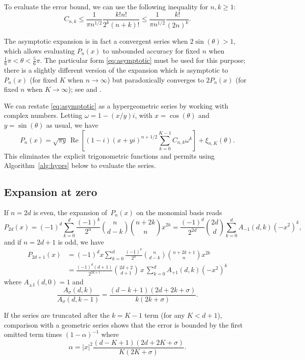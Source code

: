 \documentclass{siamart0216}
\begin{document}
To evaluate the error bound, we can use the following inequality for $n, k \ge 1$:
\begin{equation}
\label{eq:truncerr0b}
C_{n,k} \le \frac{1}{\pi n^{1/2}} \frac{k! n!}{2^k (n+k)!} \le \frac{1}{\pi n^{1/2}} \frac{k!}{(2n)^k}.
\end{equation}

The asymptotic expansion is in fact a convergent series
when $2 \sin(\theta) > 1$, which allows evaluating $P_n(x)$ to unbounded
accuracy for fixed $n$ when $\tfrac{1}{6}\pi < \theta < \tfrac{5}{6} \pi$.
The particular form \eqref{eq:asymptotic}
must be used for this purpose; there is a slightly different version of the expansion
which is asymptotic to $P_n(x)$ (for fixed $K$ when $n \to \infty$)
but paradoxically
converges to $2 P_n(x)$ (for fixed $n$ when $K \to \infty$); see \cite{Olver1997} and \cite{Olver2010}.

We can restate \eqref{eq:asymptotic} as a hypergeometric series
by working with complex numbers.
Letting $\omega = 1 - (x/y) i$, with $x = \cos(\theta)$ and $y =
\sin(\theta)$ as usual, we have
\begin{equation}
\label{eq:asymptoticcomplex}
P_n(x) = \sqrt{\pi y} \, \operatorname{Re}\left[
(1-i) (x+y i)^{n+1/2}
\sum_{k=0}^{K-1} C_{n,k} \omega^k\right] + \xi_{n,K}(\theta).
\end{equation}
This eliminates the explicit trigonometric functions and permits using
Algorithm~\ref{alg:hyprs} below to evaluate the series.

\subsection{Expansion at zero}

If $n = 2d$ is even, the expansion of $P_n(x)$ on the monomial basis
reads
$$P_{2d}(x) = (-1)^d \sum_{k=0}^d \frac{(-1)^k}{2^n} {n \choose d-k} {n+2k \choose n} x^{2k} = \frac{(-1)^d}{2^{2d}} {2d \choose d} \sum_{k=0}^d A_{-1}(d,k) (-x^2)^k,$$
and if $n = 2d+1$ is odd, we have
\begin{align*}
P_{2d+1}(x) &= (-1)^d x \sum_{k=0}^d \frac{(-1)^k}{2^n} {n \choose d-k} {n+2k+1 \choose n} x^{2k} \\
&= \frac{(-1)^d (d+1)}{2^{2d+1}} {2d+2 \choose d+1} \,x\, \sum_{k=0}^d A_{+1}(d,k) (-x^2)^k
\end{align*}
where $A_{\pm 1}(d,0) = 1$ and
$$\frac{A_{\sigma}(d,k)}{A_{\sigma}(d,k-1)} = \frac{(d-k+1) (2d+2k+\sigma)}{k (2k+\sigma)}.$$

If the series are truncated after the $k = K - 1$ term
(for any $K < d + 1$), comparison with a geometric series
shows that the error is bounded by the first
omitted term times $(1-\alpha)^{-1}$
where
\begin{equation}
\label{eq:truncerr1}
\alpha = |x|^2 \frac{(d-K+1)(2d+2K+\sigma)}{K (2K+\sigma)}.
\end{equation}
\end{document}
